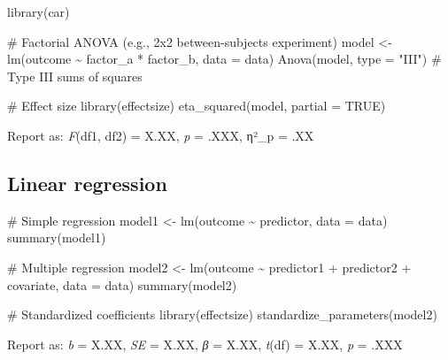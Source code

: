 \documentclass[
  11pt,
  a4paper,
]{scrbook}
\newenvironment{Shaded}{\begin{snugshade}}{\end{snugshade}}
\newcommand{\AttributeTok}[1]{\textcolor[rgb]{0.40,0.45,0.13}{#1}}
\newcommand{\CommentTok}[1]{\textcolor[rgb]{0.37,0.37,0.37}{#1}}
\newcommand{\ConstantTok}[1]{\textcolor[rgb]{0.56,0.35,0.01}{#1}}
\newcommand{\FunctionTok}[1]{\textcolor[rgb]{0.28,0.35,0.67}{#1}}
\newcommand{\NormalTok}[1]{\textcolor[rgb]{0.00,0.23,0.31}{#1}}
\newcommand{\OtherTok}[1]{\textcolor[rgb]{0.00,0.23,0.31}{#1}}
\newcommand{\SpecialCharTok}[1]{\textcolor[rgb]{0.37,0.37,0.37}{#1}}
\newcommand{\StringTok}[1]{\textcolor[rgb]{0.13,0.47,0.30}{#1}}
\begin{document}
\begin{Shaded}
\begin{Highlighting}[]
\FunctionTok{library}\NormalTok{(car)}

\CommentTok{\# Factorial ANOVA (e.g., 2x2 between{-}subjects experiment)}
\NormalTok{model }\OtherTok{\textless{}{-}} \FunctionTok{lm}\NormalTok{(outcome }\SpecialCharTok{\textasciitilde{}}\NormalTok{ factor\_a }\SpecialCharTok{*}\NormalTok{ factor\_b, }\AttributeTok{data =}\NormalTok{ data)}
\FunctionTok{Anova}\NormalTok{(model, }\AttributeTok{type =} \StringTok{"III"}\NormalTok{)   }\CommentTok{\# Type III sums of squares}

\CommentTok{\# Effect size}
\FunctionTok{library}\NormalTok{(effectsize)}
\FunctionTok{eta\_squared}\NormalTok{(model, }\AttributeTok{partial =} \ConstantTok{TRUE}\NormalTok{)}
\end{Highlighting}
\end{Shaded}

Report as: \emph{F}(df1, df2) = X.XX, \emph{p} = .XXX, η²\_p = .XX

\subsection{Linear regression}\label{linear-regression}

\begin{Shaded}
\begin{Highlighting}[]
\CommentTok{\# Simple regression}
\NormalTok{model1 }\OtherTok{\textless{}{-}} \FunctionTok{lm}\NormalTok{(outcome }\SpecialCharTok{\textasciitilde{}}\NormalTok{ predictor, }\AttributeTok{data =}\NormalTok{ data)}
\FunctionTok{summary}\NormalTok{(model1)}

\CommentTok{\# Multiple regression}
\NormalTok{model2 }\OtherTok{\textless{}{-}} \FunctionTok{lm}\NormalTok{(outcome }\SpecialCharTok{\textasciitilde{}}\NormalTok{ predictor1 }\SpecialCharTok{+}\NormalTok{ predictor2 }\SpecialCharTok{+}\NormalTok{ covariate, }\AttributeTok{data =}\NormalTok{ data)}
\FunctionTok{summary}\NormalTok{(model2)}

\CommentTok{\# Standardized coefficients}
\FunctionTok{library}\NormalTok{(effectsize)}
\FunctionTok{standardize\_parameters}\NormalTok{(model2)}
\end{Highlighting}
\end{Shaded}

Report as: \emph{b} = X.XX, \emph{SE} = X.XX, \emph{β} = X.XX,
\emph{t}(df) = X.XX, \emph{p} = .XXX
\end{document}
